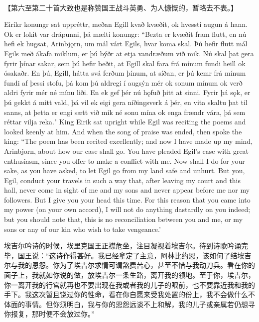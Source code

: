 \hspace*{\fill}\\
【第六至第二十首大致也是称赞国王战斗英勇、为人慷慨的，暂略去不表。】
\hspace*{\fill}\\
\begin{paracol}{2}
    Eiríkr konungr sat uppréttr, meðan Egill kvað kvæðit, ok hvessti augun á hann. Ok er lokit var drápunni, þá mælti konungr: ``Bezta er kvæðit fram flutt, en nú hefi ek hugsat, Arinbjǫrn, um mál várt Egils, hvar koma skal. Þú hefir flutt mál Egils með ákafa miklum, er þú býðr at etja vandræðum við mik. Nú skal þat gera fyrir þínar sakar, sem þú hefir beðit, at Egill skal fara frá mínum fundi heill ok ósakaðr. En þú, Egill, hátta svá ferðum þínum, at síðan, er þú kemr frá mínum fundi af þessi stofu, þá kom þú aldregi í augsýn mér ok sonum mínum ok verð aldri fyrir mér né mínu liði. En ek gef þér nú hǫfuð þitt at sinni. Fyrir þá sǫk, er þú gekkt á mitt vald, þá vil ek eigi gera níðingsverk á þér, en vita skaltu þat til sanns, at þetta er engi sætt við mik né sonu mína ok enga frændr vára, þá sem réttar vilja reka."
    \switchcolumn
    King Eirik sat upright while Egil was reciting the poems and looked keenly at him. And when the song of praise was ended, then spoke the king: ``The poem has been recited excellently; and now I have made up my mind, Arinbjorn, about how our case shall go. You have pleaded Egil's case with great enthusiasm, since you offer to make a conflict with me. Now shall I do for your sake, as you have asked, to let Egil go from my land safe and unhurt. But you, Egil, conduct your travels in such a way that, after leaving my court and this hall, never come in sight of me and my sons and never appear before me nor my followers. But I give you your head this time. For this reason that you came into my power (on your own accord), I will not do anything dastardly on you indeed; but you should note that, this is no reconciliation between you and me, or my sons or any of our kin who wish to take vengeance.'
\end{paracol}
\begin{translation*}{}
    埃吉尔吟诗的时候，埃里克国王正襟危坐，注目凝视着埃吉尔。待到诗歌吟诵完毕，国王说：“这诗作得甚好。我已经拿定了主意，阿林比约恩，该如何了结埃吉尔与我的恩怨。你为了埃吉尔求情可谓煞费苦心，甚至不惜与我动刀兵。看在你的面子上，我就如你说的做，放埃吉尔一条生路，离开我的领地。至于你，埃吉尔，你一离开我的行宫就再也不要出现在我或者我的儿子的眼前，也不要靠近我和我的手下。我这次暂且饶过你的性命，看在你自愿来受我处置的份上，我不会做什么不体面的事情。但你须明白，我与你的恩怨远谈不上和解，我的儿子或亲属若仍想寻你报复，那时便不会放过你。”
\end{translation*}

